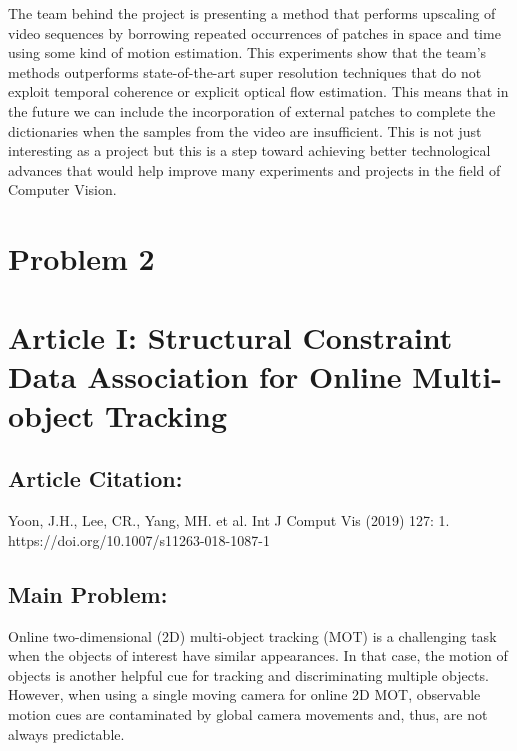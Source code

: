 \documentclass{article}
\begin{document}
\begin{adjustwidth}{1cm}{}
	The team behind the project is presenting a method that performs upscaling of video sequences by borrowing repeated occurrences of patches in space and time using some kind of motion estimation. This experiments show that the team's methods outperforms state-of-the-art super resolution techniques that do not exploit temporal coherence or explicit optical flow estimation. This means that in the future we can include the incorporation of external patches to complete the dictionaries when the samples from the video are insufficient. This is not just interesting as a project but this is a step toward achieving better technological advances that would help improve many experiments and projects in the field of Computer Vision.
\end{adjustwidth}

\newpage

\section*{Problem 2}
\section*{Article I: Structural Constraint Data Association for Online Multi-object Tracking}

\subsection*{Article Citation:} 

\begin{adjustwidth}{1cm}{}
	Yoon, J.H., Lee, CR., Yang, MH. et al. Int J Comput Vis (2019) 127: 1. https://doi.org/10.1007/s11263-018-1087-1
\end{adjustwidth}


\subsection*{Main Problem:} 

\begin{adjustwidth}{1cm}{}
Online two-dimensional (2D) multi-object tracking (MOT) is a challenging task when the objects of interest have similar appearances. In that case, the motion of objects is another helpful cue for tracking and discriminating multiple objects. However, when using a single moving camera for online 2D MOT, observable motion cues are contaminated by global camera movements and, thus, are not always predictable. 
\end{adjustwidth}
\end{document}

